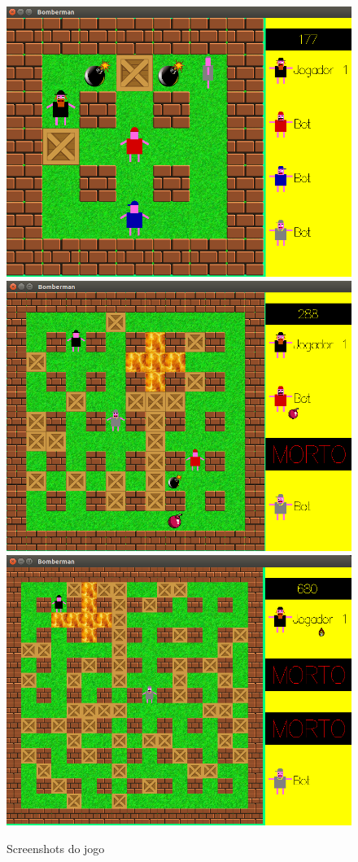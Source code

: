 \documentclass[a4paper]{article}
\begin{document}
\begin{figure}[h]
  \begin{center}
\includegraphics[scale=0.13]{imagem1.png}
\includegraphics[scale=0.13]{imagem2.png}
\includegraphics[scale=0.13]{imagem3.png}
\caption{Screenshots do jogo}
  \end{center}
\end{figure}
\end{document}
